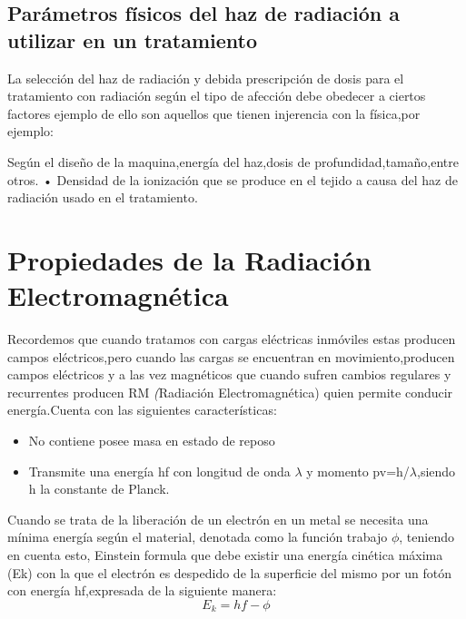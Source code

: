 \documentclass[12pt,fleqn]{book} %
\numberwithin{equation}{section} %
\numberwithin{figure}{section} %
\numberwithin{table}{section} %
\begin{document}
{%




\subsection{Parámetros físicos del haz de radiación a utilizar en un tratamiento}

La selección del haz de radiación y debida  prescripción de dosis para el tratamiento con radiación según el tipo de afección debe obedecer a ciertos factores  ejemplo de ello son aquellos que tienen injerencia con la física,por ejemplo:

Según el diseño de la maquina,energía del haz,dosis de profundidad,tamaño,entre otros.
• Densidad de la ionización que se produce en el tejido a causa del haz de radiación usado en el tratamiento.%

\section{Propiedades de la Radiación Electromagnética}

Recordemos que cuando tratamos con cargas eléctricas inmóviles estas producen campos eléctricos,pero cuando las cargas se encuentran en movimiento,producen campos eléctricos y a las vez magnéticos que cuando sufren cambios regulares y recurrentes producen RM \textit(Radiación Electromagnética) quien permite conducir energía.Cuenta con las siguientes características:
\\
\begin{itemize}
 \item No contiene posee masa en estado de reposo
 \item Transmite una energía hf con longitud de onda $\lambda$ y momento pv=h/$\lambda$,siendo h la constante de Planck.
\end{itemize}
Cuando se trata de la liberación de un electrón en un metal se necesita una mínima energía según el material, denotada como la función trabajo $\phi$, teniendo en cuenta esto, Einstein formula que debe existir una energía cinética máxima                                                                                                                                                                                                                                           (Ek) con la que el electrón es despedido de la superficie del mismo por un fotón con energía hf,expresada de la siguiente manera:
\begin{equation*}
 E_{k}=hf-\phi
\end{equation*}

}
\end{document}
